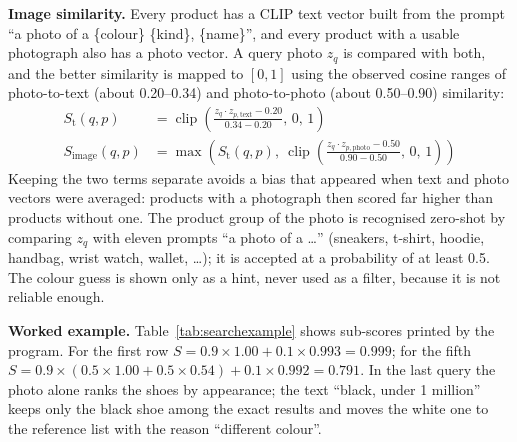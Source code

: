 \textbf{Image similarity.} Every product has a CLIP text vector built from the prompt ``a photo of a \{colour\} \{kind\}, \{name\}'', and every product with a usable photograph also has a photo vector. A query photo $z_q$ is compared with both, and the better similarity is mapped to $[0, 1]$ using the observed cosine ranges of photo-to-text (about 0.20--0.34) and photo-to-photo (about 0.50--0.90) similarity:
\begin{align}
S_\text{t}(q,p) &= \operatorname{clip}\!\left(\frac{z_q \cdot z_{p,\text{text}} - 0.20}{0.34 - 0.20},\, 0,\, 1\right)\\
S_\text{image}(q,p) &= \max\!\left( S_\text{t}(q,p),\ \operatorname{clip}\!\left(\frac{z_q \cdot z_{p,\text{photo}} - 0.50}{0.90 - 0.50},\, 0,\, 1\right) \right)
\end{align}
Keeping the two terms separate avoids a bias that appeared when text and photo vectors were averaged: products with a photograph then scored far higher than products without one. The product group of the photo is recognised zero-shot by comparing $z_q$ with eleven prompts ``a photo of a \ldots'' (sneakers, t-shirt, hoodie, handbag, wrist watch, wallet, \ldots); it is accepted at a probability of at least 0.5. The colour guess is shown only as a hint, never used as a filter, because it is not reliable enough.

\textbf{Worked example.} Table~\ref{tab:searchexample} shows sub-scores printed by the program. For the first row $S = 0.9 \times 1.00 + 0.1 \times 0.993 = 0.999$; for the fifth $S = 0.9 \times (0.5 \times 1.00 + 0.5 \times 0.54) + 0.1 \times 0.992 = 0.791$. In the last query the photo alone ranks the shoes by appearance; the text ``black, under 1 million'' keeps only the black shoe among the exact results and moves the white one to the reference list with the reason ``different colour''.


